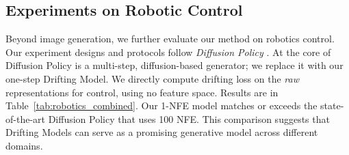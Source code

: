 \subsection{Experiments on Robotic Control}

Beyond image generation, we further evaluate our method on robotics control. Our experiment designs and protocols follow \textit{Diffusion Policy} \citep{chi2025diffusion}. At the core of Diffusion Policy is a multi-step, diffusion-based generator; we replace it with our one-step Drifting Model.
We directly compute drifting loss on the \textit{raw} representations for control, using no feature space. Results are in Table~\ref{tab:robotics_combined}.
Our 1-NFE model matches or exceeds the state-of-the-art Diffusion Policy that uses 100 NFE.
This comparison suggests that Drifting Models can serve as a promising generative model across different domains.




















